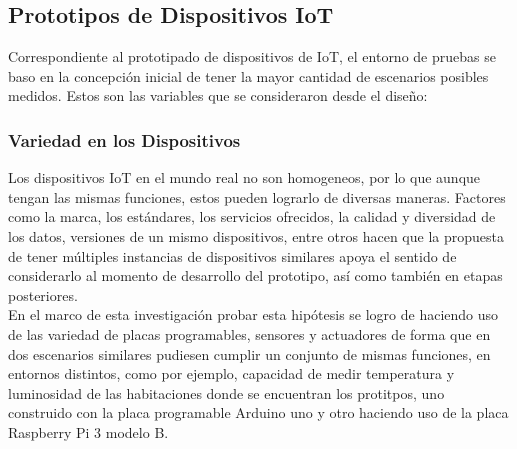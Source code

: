 \subsection{Prototipos de Dispositivos IoT}
Correspondiente al prototipado de dispositivos de IoT, el entorno de pruebas se baso en la concepción inicial de tener la mayor cantidad de escenarios posibles medidos. Estos son las variables que se consideraron desde el diseño: 

\subsubsection{Variedad en los Dispositivos}
Los dispositivos IoT en el mundo real no son homogeneos, por lo que aunque tengan las mismas funciones, estos pueden lograrlo de diversas maneras. Factores como la marca, los estándares, los servicios ofrecidos, la calidad y diversidad de los datos, versiones de un mismo dispositivos, entre otros hacen que la propuesta de tener múltiples instancias de dispositivos similares apoya el sentido de considerarlo al momento de desarrollo del prototipo, así como también en etapas posteriores.\\

En el marco de esta investigación probar esta hipótesis se logro de haciendo uso de las variedad de placas programables, sensores y actuadores de forma que en dos escenarios similares pudiesen cumplir un conjunto de mismas funciones, en entornos distintos, como por ejemplo, capacidad de medir temperatura y luminosidad de las habitaciones donde se encuentran los protitpos, uno construido con la placa programable Arduino uno y otro haciendo uso de la placa Raspberry Pi 3 modelo B.\\

